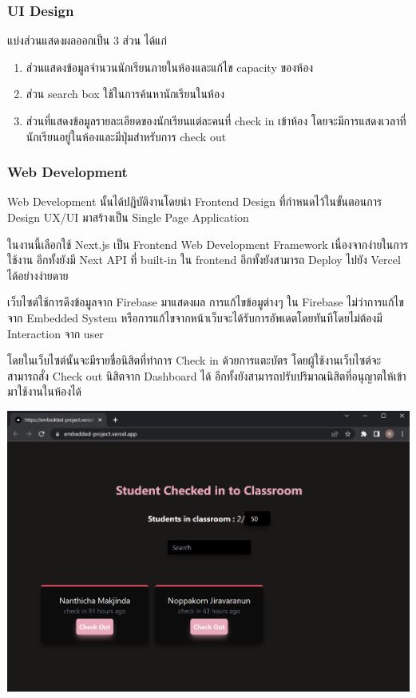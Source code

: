 \documentclass[fontsize=14pt]{extarticle}
\begin{document}
\subsubsection{UI Design}
แบ่งส่วนแสดงผลออกเป็น 3 ส่วน ได้แก่
\begin{enumerate}
    \item ส่วนแสดงข้อมูลจำนวนนักเรียนภายในห้องและแก้ไข capacity ของห้อง
    \item ส่วน search box ใช้ในการค้นหานักเรียนในห้อง
    \item ส่วนที่แสดงข้อมูลรายละเอียดของนักเรียนแต่ละคนที่ check in เข้าห้อง โดยจะมีการแสดงเวลาที่นักเรียนอยู่ในห้องและมีปุ่มสำหรับการ check out
\end{enumerate}
\subsubsection{Web Development}
\par Web Development นั้นได้ปฎิบัติงานโดยนำ Frontend Design ที่กำหนดไว้ในขั้นตอนการ
Design UX/UI มาสร้างเป็น Single Page Application
\par ในงานนี้เลือกใช้ Next.js เป็น Frontend Web Development Framework
เนื่องจากง่ายในการใช้งาน อีกทั้งยังมี Next API ที่ built-in ใน frontend
อีกทั้งยังสามารถ Deploy ไปยัง Vercel ได้อย่างง่ายดาย
\par เว็บไซต์ใช้การดึงข้อมูลจาก Firebase มาแสดงผล การแก้ไขข้อมูต่างๆ ใน Firebase
ไม่ว่าการแก้ไขจาก Embedded System หรือการแก้ไขจากหน้าเว็บจะได้รับการอัพเดตโดยทันทีโดยไม่ต้องมี
Interaction จาก user
\par โดยในเว็บไซต์นั้นจะมีรายชื่อนิสิตที่ทำการ Check in ด้วยการแตะบัตร
โดยผู้ใช้งานเว็บไซต์จะสามารถสั่ง Check out นิสิตจาก Dashboard ได้
อีกทั้งยังสามารถปรับปริมาณนิสิตที่อนุญาตให้เข้ามาใช้งานในห้องได้
\begin{center}
    \includegraphics[width=\textwidth]{Web.png}
\end{center}
\pagebreak
\end{document}
